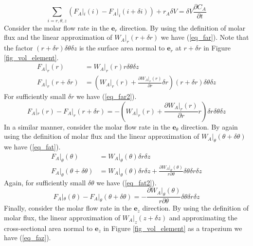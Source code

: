 \documentclass[11pt,fleqn]{article}
\theoremstyle{defstyle}
\begin{document}
\begin{equation}
\sum_{i=r, \theta, z}\left(F_A|_i(i) - F_A|_i(i+\delta i)\right) + r_A \delta V = \delta V \frac{\partial C_A}{\partial t}
\label{eq_mole_balance}
\end{equation}
Consider the molar flow rate in the $\mathbf{e}_r$ direction. By using the definition of molar flux and the linear approximation of $W_A|_r(r+\delta r)$ we have (\ref{eq_far}). Note that the factor $(r+\delta r)\delta \theta \delta z$ is the surface area normal to $\mathbf{e}_r$ at $r+\delta r$ in Figure \ref{fig_vol_element}.
\begin{equation}
\begin{aligned}
F_A|_r(r) &= W_A|_r(r) r \delta \theta \delta z \\
F_A|_r(r+\delta r) &= \left(W_ A|_r(r) + \frac{\partial W_A|_r(r)}{\partial r} \delta r\right)(r+\delta r)\delta \theta \delta z
\end{aligned}
\label{eq_far}
\end{equation}
For sufficiently small $\delta r$ we have (\ref{eq_far2}).  
\begin{equation}
F_A|_r(r) - F_A|_r(r+\delta r)  = - \left(W_ A|_r(r)  + \frac{\partial W_A|_r(r)}{\partial r}r\right) \delta r \delta \theta \delta z
\label{eq_far2}
\end{equation}
In a similar manner, consider the molar flow rate in the $\mathbf{e}_\theta$ direction. By again using the definition of molar flux and the linear approximation of $W_A|_\theta(\theta+\delta \theta)$ we have (\ref{eq_fat}).
\begin{equation}
\begin{aligned}
F_A|_\theta(\theta) &= W_A|_\theta(\theta) \delta r \delta z \\
F_A|_\theta(\theta + \delta \theta) &= W_A|_\theta(\theta) \delta r \delta z + \frac{\partial W_A|_\theta(\theta)}{r \partial \theta}\delta \theta\delta r \delta z
\end{aligned}
\label{eq_fat}
\end{equation}
Again, for sufficiently small $\delta \theta$ we have (\ref{eq_fat2}).
\begin{equation}
F_A|_\theta(\theta) - F_A|_\theta(\theta + \delta \theta) =- \frac{\partial W_A|_\theta(\theta)}{r \partial \theta}\delta \theta\delta r \delta z
\label{eq_fat2} 
\end{equation}
Finally, consider the molar flow rate in the $\mathbf{e}_z$ direction. By using the definition of molar flux, the linear approximation of $W_A|_z(z+\delta z)$ and approximating the cross-sectional area normal to $\mathbf{e}_z$ in Figure \ref{fig_vol_element} as a trapezium we have (\ref{eq_faz}).
\end{document}
